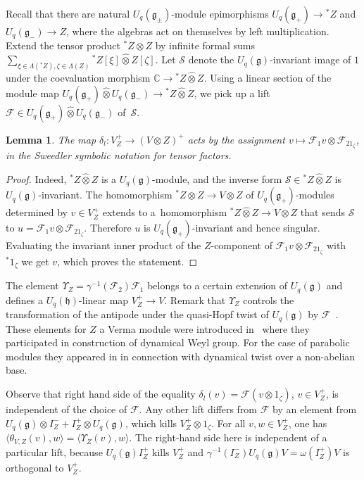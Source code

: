 \documentclass[11pt]{article}
\numberwithin{equation}{section}
\newtheorem{Lemma}[Theorem]{Lemma}
\begin{document}
Recall that there are natural $U_q(\mathfrak{g}_\pm)$-module epimorphisms $U_q(\mathfrak{g}_+)\to {}^*\!Z$ and $U_q(\mathfrak{g}_-)\to Z$, where the algebras act on themselves by left multiplication. Extend the tensor product ${}^*\!Z\otimes Z$ by infinite formal sums $\sum_{\xi\in \Lambda({}^*\!Z), \zeta\in \Lambda(Z)}{}^*\!Z[\xi]\hat \otimes Z[\zeta]$. Let $\mathcal{S}$ denote the $U_q(\mathfrak{g})$-invariant image of $1$ under the coevaluation morphism $\mathbb{C}\to {}^*\!Z\hat \otimes Z$. Using a linear section of the module map $U_q(\mathfrak{g}_+)\hat \otimes U_q(\mathfrak{g}_-)\to {}^*\!Z\hat \otimes Z$, we pick up a lift $\mathcal{F}\in U_q(\mathfrak{g}_+)\hat \otimes U_q(\mathfrak{g}_-)$ of~$\mathcal{S}$.
\begin{Lemma}The map $\delta_l\colon V^+_Z\to (V\otimes Z)^+$ acts by the assignment $v\mapsto \mathcal{F}_1v\otimes \mathcal{F}_21_\zeta$, in the Sweedler symbolic notation for tensor factors.
\end{Lemma}
\begin{proof} Indeed, ${}^*\!Z\hat \otimes Z$ is a $U_q(\mathfrak{g})$-module, and the inverse form $\mathcal{S}\in {}^*\!Z\hat \otimes Z$ is $U_q(\mathfrak{g})$-invariant. The homomorphism ${}^*\!Z \otimes Z\to V\otimes Z$ of $U_q(\mathfrak{g}_+)$-modules determined by $v\in V^+_Z$ extends to a~homomorphism ${}^*\!Z\hat \otimes Z\to V\otimes Z$ that sends $\mathcal{S}$ to $u=\mathcal{F}_1v\otimes \mathcal{F}_21_\zeta$. Therefore $u$ is $U_q(\mathfrak{g}_+)$-invariant and hence singular. Evaluating the invariant inner product of the $Z$-component of $\mathcal{F}_1v\otimes \mathcal{F}_21_\zeta$ with ${}^*\!1_\zeta$ we get $v$, which proves the statement.
\end{proof}

The element $\Upsilon_Z = \gamma^{-1}(\mathcal{F}_2)\mathcal{F}_1$ belongs to a certain extension of $U_q(\mathfrak{g})$ and defines a $U_q(\mathfrak{h})$-linear map $V^+_Z\to V$. Remark that $\Upsilon_Z$ controls the transformation of the antipode under the quasi-Hopf twist of $U_q(\mathfrak{g})$ by $\mathcal{F}$~\cite{D1}. These elements for $Z$ a Verma module were introduced in~\cite{EV} where they participated in construction of dynamical Weyl group. For the case of parabolic modules they appeared in \cite{KM} in connection with dynamical twist over a non-abelian base.

Observe that right hand side of the equality $\delta_l(v)=\mathcal{F}(v\otimes 1_\zeta)$, $v\in V^+_Z$, is independent of the choice of $\mathcal{F}$. Any other lift differs from $\mathcal{F}$ by an element from $U_q(\mathfrak{g})\otimes I_Z^-+ I^+_Z \otimes U_q(\mathfrak{g})$, which kills $V^+_Z\otimes 1_\zeta$. For all $v,w\in V^+_Z$, one has $\langle \theta_{V,Z}(v),w\rangle=\langle \Upsilon_Z(v),w\rangle$. The right-hand side here is independent of a particular lift, because $U_q(\mathfrak{g})I^+_Z$ kills $V^+_Z$ and $\gamma^{-1}(I^-_Z)U_q(\mathfrak{g})V= \omega(I^+_Z)V$ is orthogonal to $V^+_Z$.
\end{document}
